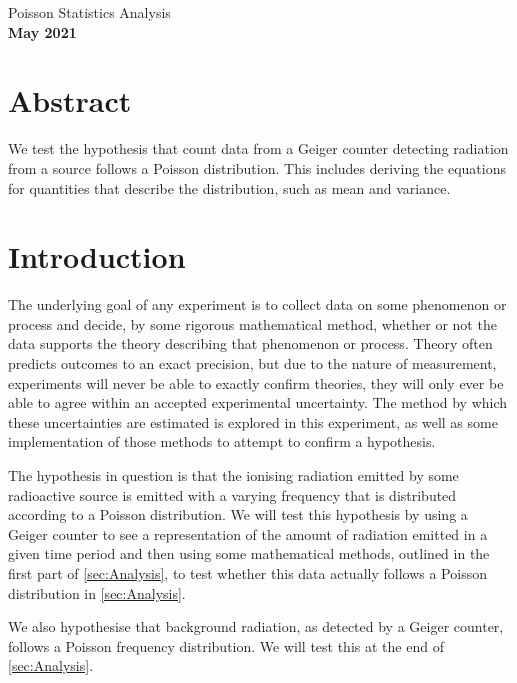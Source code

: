 \documentclass[12pt]{article}
\numberwithin{equation}{section}
\numberwithin{figure}{section}
\numberwithin{table}{section}
\begin{document}
\begin{center}
    {\huge Poisson Statistics Analysis}\\
    \vspace{0.2in}
    \textbf{May 2021}

    \section*{Abstract}
    We test the hypothesis that count data from a Geiger counter detecting radiation from a  source follows a Poisson distribution. This includes deriving the equations for quantities that describe the distribution, such as mean and variance. 

\end{center}

\section{Introduction}\label{sec:Introduction}
\par The underlying goal of any experiment is to collect data on some phenomenon or process and decide, by some rigorous mathematical method, whether or not the data supports the theory describing that phenomenon or process. Theory often predicts outcomes to an exact precision, but due to the nature of measurement, experiments will never be able to exactly confirm theories, they will only ever be able to agree within an accepted experimental uncertainty. The method by which these uncertainties are estimated is explored in this experiment, as well as some implementation of those methods to attempt to confirm a hypothesis. 
\par The hypothesis in question is that the ionising radiation emitted by some radioactive source is emitted with a varying frequency that is distributed according to a Poisson distribution. We will test this hypothesis by using a Geiger counter to see a representation of the amount of radiation emitted in a given time period and then using some mathematical methods, outlined in the first part of \autoref{sec:Analysis}, to test whether this data actually follows a Poisson distribution in \autoref{sec:Analysis}. 
\par We also hypothesise that background radiation, as detected by a Geiger counter, follows a Poisson frequency distribution. We will test this at the end of \autoref{sec:Analysis}.
\end{document}
